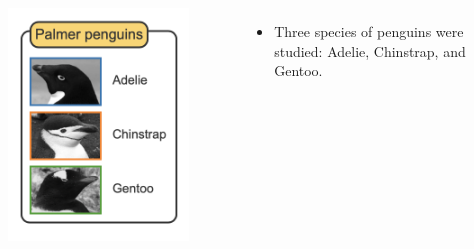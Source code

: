 \documentclass[8pt,dvipsnames]{beamer}
\begin{document}
\begin{frame}{}
	\begin{columns}
		\begin{figure}
			\centering
			\includegraphics[width=\textwidth]{imgs/knn_2.png}
		\end{figure}
		\begin{itemize}
			\item Three species of penguins were studied: Adelie, Chinstrap, and Gentoo.
		\end{itemize}
	\end{columns}
\end{frame}
\end{document}
